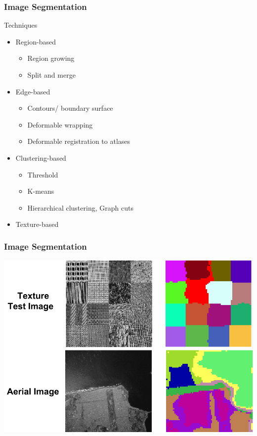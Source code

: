 \documentclass{beamer}
\begin{document}
\begin{frame}
\frametitle{Image Segmentation}
\begin{block}{Techniques}
\begin{itemize}
\item Region-based
\begin{itemize}
\item Region growing
\item Split and merge
\end{itemize}
\item Edge-based 
\begin{itemize}
\item Contours/ boundary surface 
\item Deformable wrapping
\item Deformable registration to atlases
\end{itemize}
\item Clustering-based 
\begin{itemize}
\item Threshold
\item K-means
\item Hierarchical clustering, Graph cuts 
\end{itemize}
\item Texture-based
\end{itemize}
\end{block}
\end{frame}
\begin{frame}
\frametitle{Image Segmentation}
\begin{center}
\includegraphics[scale=0.35]{images/L8_TextureAerial.png}
\end{center}
\end{frame}
\end{document}
